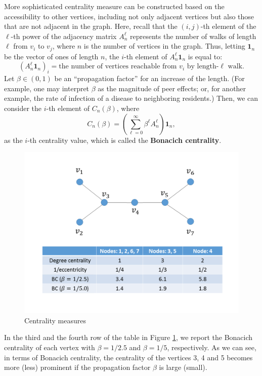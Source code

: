 \documentclass[10.5pt, A4paper, openany, uplatex]{book}
\numberwithin{equation}{section}
\begin{document}
\begin{appendices}
	More sophisticated centrality measure can be constructed based on the accessibility to other vertices, including not only adjacent vertices but also those that are not adjacent in the graph. 
	Here, recall that the $(i,j)$-th element of the $\ell$-th power of the adjacency matrix $A_n^\ell$ represents the number of walks of length $\ell$ from $v_i$ to $v_j$, where $n$ is the number of vertices in the graph.
	Thus, letting $\mathbf{1}_n$ be the vector of ones of length $n$, the $i$-th element of $A_n^\ell \mathbf{1}_n$ is equal to:
	\[
		(A_n^\ell \mathbf{1}_n)_i = \text{the number of vertices reachable from $v_i$ by length-$\ell$ walk.}
	\]
	Let $\beta \in (0,1)$ be an ``propagation factor'' for an increase of the length.
	(For example, one may interpret $\beta$ as the magnitude of peer effects; or, for another example, the rate of infection of a disease to neighboring residents.)
	Then, we can consider the $i$-th element of $C_n(\beta)$, where
	\[
		C_n(\beta) = \left( \sum_{\ell = 0}^\infty \beta^\ell A_n^\ell \right) \mathbf{1}_n,
	\]
	as the $i$-th centrality value, which is called the \textbf{Bonacich centrality}.
	
	\begin{figure}[h!]
		\begin{center}
			\includegraphics[width = 14cm]{central.png}
			\caption{Centrality measures\label{fig:center}}
		\end{center}
	\end{figure}
	
	In the third and the fourth row of the table in Figure \ref{fig:center}, we report the Bonacich centrality of each vertex with $\beta = 1/2.5$ and $\beta = 1/5$, respectively.
	As we can see, in terms of Bonacich centrality, the centrality of the vertices 3, 4 and 5 becomes more (less) prominent if the propagation factor $\beta$ is large (small).
	

\end{appendices}
\end{document}
